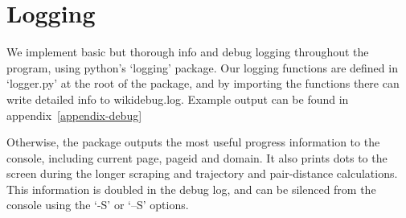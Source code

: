 \section{Logging}
We implement basic but thorough info and debug logging throughout the
program, using python's `logging' package. Our logging functions are
defined in `logger.py' at the root of the package, and by importing
the functions there can write detailed info to wikidebug.log. Example
output can be found in appendix~\ref{appendix-debug}

Otherwise, the package outputs the most useful progress information to
the console, including current page, pageid and domain. It also prints
dots to the screen during the longer scraping and trajectory and
pair-distance calculations. This information is doubled in the debug
log, and can be silenced from the console using the `-S' or `--S'
options.
